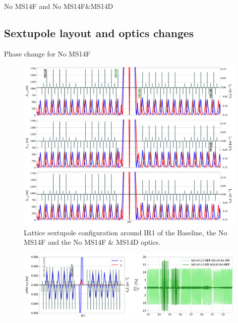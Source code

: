 \documentclass{cernatsnote}
\begin{document}
No MS14F and No MS14F\&MS14D

\subsection{Sextupole layout and optics changes }

Phase change for No MS14F

\begin{figure}[h!]
\centering
\includegraphics[width=1\textwidth]{images/twiss_k2l_allnoms10_b1.pdf}
\caption{\label{fig_twiss_all} Lattice sextupole configuration around IR1 of the Baseline, the No MS14F and the No MS14F \& MS14D optics.}
\end{figure}

\begin{figure}[h!]
\centering
\includegraphics[width=1\textwidth]{images/ca_k2l_noms14falt_b1_ip5.pdf}\\
\caption{\label{noms14falt_optics} }
\end{figure}
\end{document}
